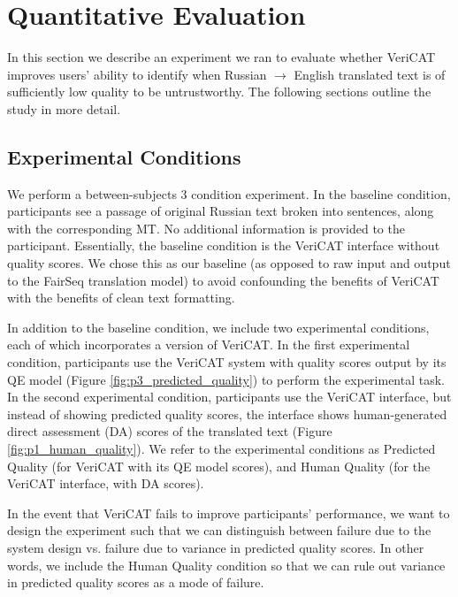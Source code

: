 \section{Quantitative Evaluation} 

In this section we describe an experiment we ran to evaluate whether VeriCAT improves users' ability to identify when Russian $\rightarrow$ English translated text is of sufficiently low quality to be untrustworthy. The following sections outline the study in more detail. 

\subsection{Experimental Conditions}

We perform a between-subjects 3 condition experiment. In the baseline condition, participants see a passage of original Russian text broken into sentences, along with the corresponding MT. No additional information is provided to the participant. Essentially, the baseline condition is the VeriCAT interface without quality scores. We chose this as our baseline (as opposed to raw input and output to the FairSeq translation model) to avoid confounding the benefits of VeriCAT with the benefits of clean text formatting. %

In addition to the baseline condition, we include two experimental conditions, each of which incorporates a version of VeriCAT. 
In the first experimental condition, participants use the VeriCAT system with quality scores output by its QE model (Figure \ref{fig:p3_predicted_quality}) to perform the experimental task. 
In the second experimental condition, participants use the VeriCAT interface, but instead of showing predicted quality scores, the interface shows human-generated direct assessment (DA) scores of the translated text (Figure \ref{fig:p1_human_quality}). 
We refer to the experimental conditions as Predicted Quality (for VeriCAT with its QE model scores), and Human Quality (for the VeriCAT interface, with DA scores). 

In the event that VeriCAT fails to improve participants' performance, we want to design the experiment such that we can distinguish between failure due to the system design vs. failure due to variance in predicted quality scores. In other words, we include the Human Quality condition so that we can rule out variance in predicted quality scores as a mode of failure. 

